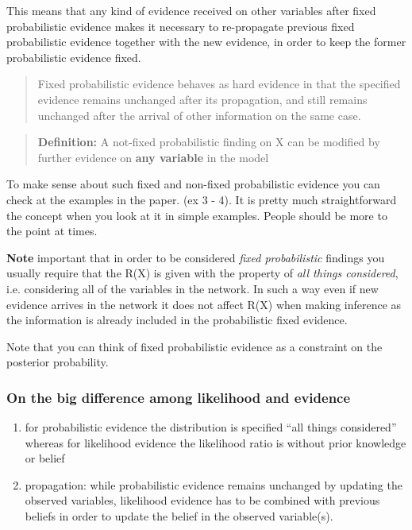 \documentclass[a4paper]{article}
\begin{document}
This means that any kind of evidence received on other variables after fixed
probabilistic evidence makes it necessary to re-propagate previous
fixed probabilistic evidence together with the new evidence, in
order to keep the former probabilistic evidence fixed.

\begin{quote}
Fixed probabilistic evidence behaves as hard evidence in that the
specified evidence remains unchanged after its propagation, and still
remains unchanged after the arrival of other information on the same
case.
\end{quote}

\begin{quote}
\textbf{Definition:} A not-fixed probabilistic finding on X can be
modified by further evidence on \textbf{any variable} in the model
\end{quote}

To make sense about such fixed and non-fixed probabilistic
evidence you can check at the examples in the paper. (ex 3 -
4). It is pretty much straightforward the concept when you look at
it in simple examples. People should be more to the point at
times.

\textbf{Note} important that in order to be considered \emph{fixed
probabilistic} findings you usually require that the R(X) is given
with the property of \emph{all things considered}, i.e. considering all
of the variables in the network. In such a way even if new
evidence arrives in the network it does not affect R(X) when
making inference as the information is already included in the
probabilistic fixed evidence.

Note that you can think of fixed probabilistic evidence as a
constraint on the posterior probability.


\subsubsection{On the big difference among likelihood and evidence}
\label{sec:org661372d}


\begin{enumerate}
\item for probabilistic evidence the distribution is specified “all
things considered” whereas for likelihood evidence the
likelihood ratio is without prior knowledge or belief

\item propagation: while probabilistic evidence remains unchanged by
updating the observed variables, likelihood evidence has to be
combined with previous beliefs in order to update the belief in
the observed variable(s).
\end{enumerate}
\end{document}
